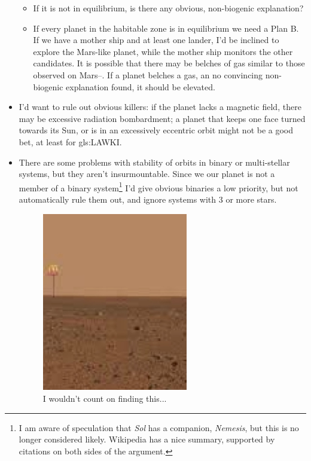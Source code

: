 \documentclass[]{article}
\begin{document}
\begin{itemize}
	\begin{itemize}
		\item If it is not in equilibrium, is there any obvious, non-biogenic explanation?
		\item If every planet in the habitable zone is in equilibrium we need a Plan B. If we have a mother ship and at least one lander, I'd be inclined to explore the Mars-like planet, while the mother ship monitors the other candidates. It is possible that there may be belches of gas similar to those observed on Mars--\cite{nasa2019curiosity}. If a planet belches a gas, an no convincing non-biogenic explanation found, it should be elevated. 
	\end{itemize}
	\item I'd want to rule out obvious killers: if the planet lacks a magnetic field, there may be excessive radiation bombardment; a planet that keeps one face turned towards its Sun, or is in an excessively eccentric orbit might not be a good bet, at least for \gls{gls:LAWKI}.
	\item There are some problems with stability of orbits in binary or multi-stellar systems\cite{elke2019planetary}, but they aren't insurmountable. Since we our planet is not a member of a binary system\footnote{I am aware of speculation that \emph{Sol} has a companion, \emph{Nemesis}\cite{raup1984periodicity}, but this is no longer considered likely\cite{nasa2011tyche}. Wikipedia\cite{ wiki:nemesis} has a nice summary, supported by citations on both sides of the argument.} I'd give obvious binaries a low priority, but not automatically rule them out, and ignore systems with 3 or more stars. 
	\begin{figure}[H]
		\begin{center}
			\caption{I wouldn't count on finding this...}
			\includegraphics[width=0.6\textwidth]{McDonaldsMars}
		\end{center}
	\end{figure}
\end{itemize}
\end{document}
